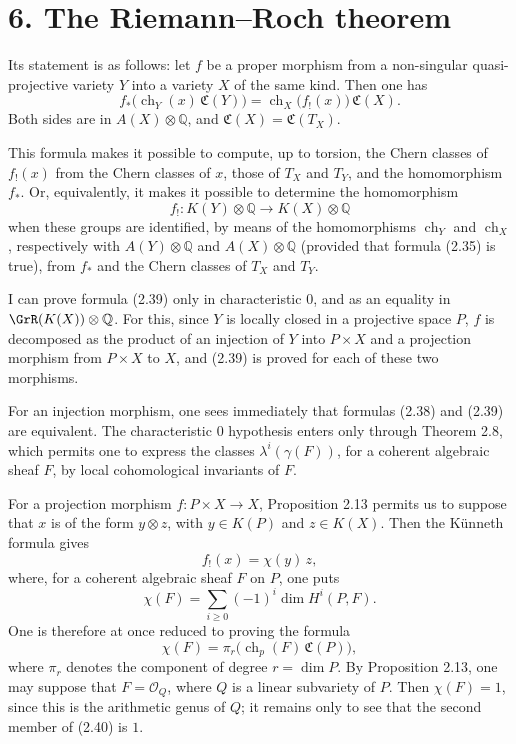 \documentclass[11pt]{article}
\newcommand{\ch}{\operatorname{ch}}
\providecommand{\ch}{\operatorname{ch}}
\begin{document}
\section*{6. The Riemann--Roch theorem}

Its statement is as follows: let \(f\) be a proper morphism from a non-singular quasi-projective variety \(Y\) into a variety \(X\) of the same kind. Then one has
\begin{equation}\tag{2.39}
 f_*\bigl(\ch_Y(x)\,\mathfrak C(Y)\bigr)
 =
 \ch_X\bigl(f_!(x)\bigr)\,\mathfrak C(X).
\end{equation}
Both sides are in \(A(X)\otimes \mathbb Q\), and \(\mathfrak C(X)=\mathfrak C(T_X)\).

This formula makes it possible to compute, up to torsion, the Chern classes of \(f_!(x)\) from the Chern classes of \(x\), those of \(T_X\) and \(T_Y\), and the homomorphism \(f_*\). Or, equivalently, it makes it possible to determine the homomorphism
\[
  f_!:K(Y)\otimes \mathbb Q \longrightarrow K(X)\otimes \mathbb Q
\]
when these groups are identified, by means of the homomorphisms \(\ch_Y\) and \(\ch_X\), respectively with \(A(Y)\otimes \mathbb Q\) and \(A(X)\otimes \mathbb Q\) (provided that formula (2.35) is true), from \(f_*\) and the Chern classes of \(T_X\) and \(T_Y\).

I can prove formula (2.39) only in characteristic \(0\), and as an equality in \(\GrR(K(X))\otimes\mathbb Q\). For this, since \(Y\) is locally closed in a projective space \(P\), \(f\) is decomposed as the product of an injection of \(Y\) into \(P\times X\) and a projection morphism from \(P\times X\) to \(X\), and (2.39) is proved for each of these two morphisms.

For an injection morphism, one sees immediately that formulas (2.38) and (2.39) are equivalent. The characteristic \(0\) hypothesis enters only through Theorem 2.8, which permits one to express the classes \(\lambda^i(\gamma(F))\), for a coherent algebraic sheaf \(F\), by local cohomological invariants of \(F\).

For a projection morphism \(f:P\times X\to X\), Proposition 2.13 permits us to suppose that \(x\) is of the form \(y\otimes z\), with \(y\in K(P)\) and \(z\in K(X)\). Then the Künneth formula gives
\[
  f_!(x)=\chi(y)\,z,
\]
where, for a coherent algebraic sheaf \(F\) on \(P\), one puts
\[
  \chi(F)=\sum_{i\geq 0}(-1)^i\dim H^i(P,F).
\]
One is therefore at once reduced to proving the formula
\begin{equation}\tag{2.40}
  \chi(F)=\pi_r\bigl(\ch_p(F)\,\mathfrak C(P)\bigr),
\end{equation}
where \(\pi_r\) denotes the component of degree \(r=\dim P\). By Proposition 2.13, one may suppose that \(F=\mathcal O_Q\), where \(Q\) is a linear subvariety of \(P\). Then \(\chi(F)=1\), since this is the arithmetic genus of \(Q\); it remains only to see that the second member of (2.40) is \(1\).
\end{document}
